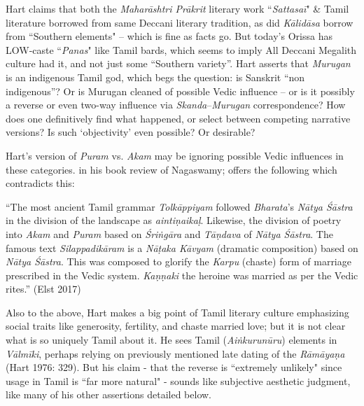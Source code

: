 Hart claims that both the \textit{Maharāshtri Prākrit} literary work “\textit{Sattasaī}" \& Tamil literature borrowed from same Deccani literary tradition, as did \textit{Kālidāsa } borrow from “Southern elements" – which is fine as facts go. But today’s Orissa has LOW-caste “\textit{Panas}" like Tamil bards, which seems to imply All Deccani Megalith culture had it, and not just some “Southern variety”. Hart asserts that \textit{Murugan} is an indigenous Tamil god, which begs the question: is Sanskrit “non indigenous”? Or is Murugan cleaned of possible Vedic influence – or is it possibly a reverse or even two-way influence via \textit{Skanda}–\textit{Murugan} correspondence? How does one definitively find what happened, or select between competing narrative versions? Is such ‘objectivity’ even possible? Or desirable?

Hart’s version of \textit{Puram} vs. \textit{Akam} may be ignoring possible Vedic influences in these categories. in his book review of Nagaswamy; offers the following which contradicts this:

\begin{myquote}
“The most ancient Tamil grammar \textit{Tolkāppiyam} followed \textit{Bharata}’s \textit{Nātya Śāstra} in the division of the landscape as \textit{aintiṇaikaḷ}. Likewise, the division of poetry into \textit{Akam} and \textit{Puram} based on \textit{Śriṅgāra } and \textit{Tāṇdava } of \textit{Nātya Śāstra}. The famous text \textit{Silappadikāram} is a \textit{Nāṭaka Kāvyam} (dramatic composition) based on \textit{Nātya Śāstra}. This was composed to glorify the \textit{Karpu} (chaste) form of marriage prescribed in the Vedic system. \textit{Kaṇṇaki} the heroine was married as per the Vedic rites.” \hfill (Elst 2017)
\end{myquote}

Also to the above, Hart makes a big point of Tamil literary culture emphasizing social traits like generosity, fertility, and chaste married love; but it is not clear what is so uniquely Tamil about it. He sees Tamil (\textit{Aiṅkurunūru}) elements in \textit{Vālmīki}, perhaps relying on previously mentioned late dating of the \textit{Rāmāyaṇa} (Hart 1976: 329). But his claim - that the reverse is “extremely unlikely" since usage in Tamil is “far more natural" - sounds like subjective aesthetic judgment, like many of his other assertions detailed below.

